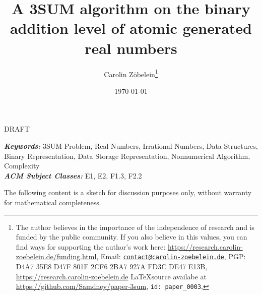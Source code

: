 \documentclass{article}
\newtheorem*{theorem A}{Theorem A}
\newtheorem*{theorem B}{N\"olker's Theorem}
\theoremstyle{remark}
\theoremstyle{remark}
\begin{document}
\title{A 3SUM algorithm on the binary addition level of atomic generated real numbers}
\author{Carolin Z\"obelein\thanks{The author believes in the importance of the independence of research and is funded by the public community. If you also believe in this values, you can find ways for supporting the author's work here: \url{https://research.carolin-zoebelein.de/funding.html}, Email: \href{mailto:contact@carolin-zoebelein.de}{\texttt{contact@carolin-zoebelein.de}}, PGP: D4A7 35E8 D47F 801F 2CF6 2BA7 927A FD3C DE47 E13B, \url{https://research.carolin-zoebelein.de} \LaTeX source availabe at \url{https://github.com/Samdney/paper-3sum}, \texttt{id: paper\_0003}, \Cooley}}
\date{\today}
\maketitle
\begin{center}
    DRAFT
\end{center}
\begin{abstract}
    \blindtext[1]
\end{abstract}
\providecommand{\keywords}[1]{\small{\textbf{\textit{Keywords:}} #1}}
\providecommand{\Classification}[1]{\small{\textbf{\textit{ACM Subject Classes:}} #1}}

\begin{flushleft}
    \keywords{3SUM Problem, Real Numbers, Irrational Numbers, Data Structures, Binary Representation, Data Storage Representation, Nonnumerical Algorithm, Complexity}\\
    \Classification{E1, E2, F1.3, F2.2}
\end{flushleft}
\tableofcontents
The following content is a sketch for discussion purposes only, without warranty for mathematical completeness.
\end{document}
